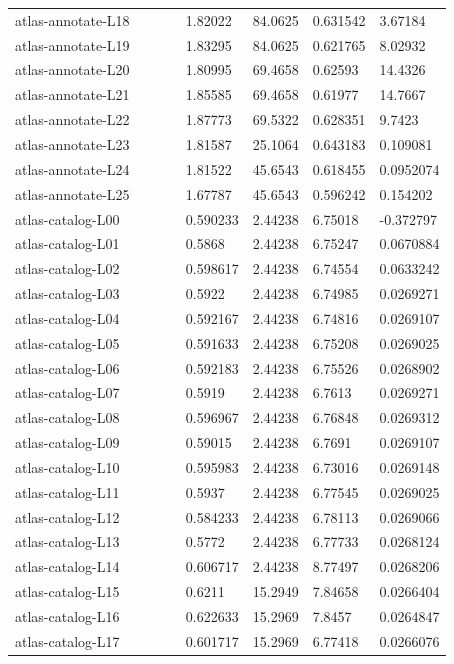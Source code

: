 \begin{longtable}{@{}L{0.39\linewidth}L{0.11\linewidth}L{0.12\linewidth}L{0.12\linewidth}L{0.13\linewidth}@{}}
atlas-annotate-L18 & 1.82022 & 84.0625 & 0.631542 & 3.67184 \\
atlas-annotate-L19 & 1.83295 & 84.0625 & 0.621765 & 8.02932 \\
atlas-annotate-L20 & 1.80995 & 69.4658 & 0.62593 & 14.4326 \\
atlas-annotate-L21 & 1.85585 & 69.4658 & 0.61977 & 14.7667 \\
atlas-annotate-L22 & 1.87773 & 69.5322 & 0.628351 & 9.7423 \\
atlas-annotate-L23 & 1.81587 & 25.1064 & 0.643183 & 0.109081 \\
atlas-annotate-L24 & 1.81522 & 45.6543 & 0.618455 & 0.0952074 \\
atlas-annotate-L25 & 1.67787 & 45.6543 & 0.596242 & 0.154202 \\
atlas-catalog-L00 & 0.590233 & 2.44238 & 6.75018 & -0.372797 \\
atlas-catalog-L01 & 0.5868 & 2.44238 & 6.75247 & 0.0670884 \\
atlas-catalog-L02 & 0.598617 & 2.44238 & 6.74554 & 0.0633242 \\
atlas-catalog-L03 & 0.5922 & 2.44238 & 6.74985 & 0.0269271 \\
atlas-catalog-L04 & 0.592167 & 2.44238 & 6.74816 & 0.0269107 \\
atlas-catalog-L05 & 0.591633 & 2.44238 & 6.75208 & 0.0269025 \\
atlas-catalog-L06 & 0.592183 & 2.44238 & 6.75526 & 0.0268902 \\
atlas-catalog-L07 & 0.5919 & 2.44238 & 6.7613 & 0.0269271 \\
atlas-catalog-L08 & 0.596967 & 2.44238 & 6.76848 & 0.0269312 \\
atlas-catalog-L09 & 0.59015 & 2.44238 & 6.7691 & 0.0269107 \\
atlas-catalog-L10 & 0.595983 & 2.44238 & 6.73016 & 0.0269148 \\
atlas-catalog-L11 & 0.5937 & 2.44238 & 6.77545 & 0.0269025 \\
atlas-catalog-L12 & 0.584233 & 2.44238 & 6.78113 & 0.0269066 \\
atlas-catalog-L13 & 0.5772 & 2.44238 & 6.77733 & 0.0268124 \\
atlas-catalog-L14 & 0.606717 & 2.44238 & 8.77497 & 0.0268206 \\
atlas-catalog-L15 & 0.6211 & 15.2949 & 7.84658 & 0.0266404 \\
atlas-catalog-L16 & 0.622633 & 15.2969 & 7.8457 & 0.0264847 \\
atlas-catalog-L17 & 0.601717 & 15.2969 & 6.77418 & 0.0266076 \\

\end{longtable}
